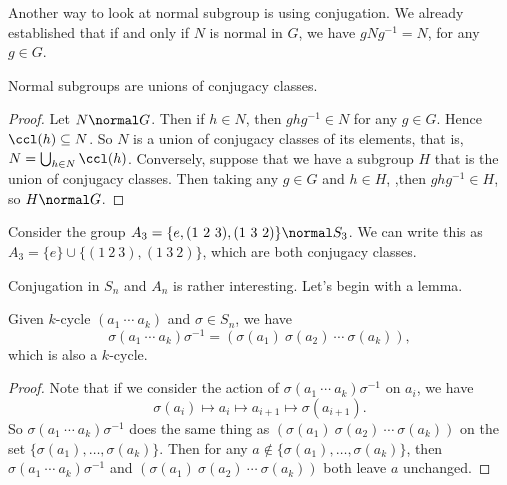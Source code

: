 Another way to look at normal subgroup is using conjugation. We already established that if and only if $N$ is normal in $G$, we have $g N g^{-1} = N$, for any $g \in G$.

\begin{proposition}
	Normal subgroups are unions of conjugacy classes.
\end{proposition}
\begin{proof}
	Let $N \normal G$. Then if $h \in N$, then $ghg^{-1} \in N$ for any $g \in G$. Hence $\ccl(h) \subseteq N$.
	So $N$ is a union of conjugacy classes of its elements, that is, $N = \bigcup_{h \in N} \ccl(h)$.
	Conversely, suppose that we have a subgroup $H$ that is the union of conjugacy classes. Then taking any $g \in G$ and $h \in H$, ,then $ghg^{-1} \in H$, so $H \normal G$.
\end{proof}

\begin{example}
	Consider the group $A_3 = \{e, (1\ 2\ 3), (1\ 3\ 2)\} \normal S_3$. We can write this as $A_3 = \{e\} \cup \{(1\ 2\ 3), (1\ 3\ 2)\}$, which are both conjugacy classes.
\end{example}

Conjugation in $S_n$ and $A_n$ is rather interesting. Let's begin with a lemma.

\begin{lemma}
	Given $k$-cycle $(a_1\ \cdots\ a_k)$ and $\sigma \in S_n$, we have
	$$
	\sigma (a_1 \ \cdots\ a_k) \sigma^{-1} = (\sigma(a_1)\ \sigma(a_2)\ \cdots \ \sigma(a_k)),
	$$
	which is also a $k$-cycle.
\end{lemma}
\begin{proof}
	Note that if we consider the action of $\sigma (a_1 \ \cdots\ a_k) \sigma^{-1}$ on $a_i$, we have
	$$
	\sigma(a_i) \mapsto a_{i} \mapsto a_{i + 1} \mapsto \sigma(a_{i + 1}).
	$$
	So $\sigma (a_1 \ \cdots\ a_k) \sigma^{-1}$ does the same thing as $(\sigma(a_1)\ \sigma(a_2)\ \cdots \ \sigma(a_k))$ on the set $\{\sigma(a_1), \dots, \sigma(a_k)\}$.  Then for any $a \not \in \{\sigma(a_1), \dots, \sigma(a_k)\}$, then $\sigma (a_1 \ \cdots\ a_k) \sigma^{-1}$ and  $(\sigma(a_1)\ \sigma(a_2)\ \cdots \ \sigma(a_k))$ both leave $a$ unchanged.
\end{proof}


